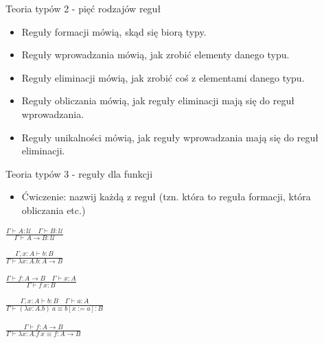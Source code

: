\documentclass{beamer}
\newcommand{\U}{\mathcal{U}}
\begin{document}
\begin{frame}{Teoria typów 2 - pięć rodzajów reguł}
\begin{itemize}
	\item Reguły formacji mówią, skąd się biorą typy.
	\item Reguły wprowadzania mówią, jak zrobić elementy danego typu.
	\item Reguły eliminacji mówią, jak zrobić coś z elementami danego typu.
	\item Reguły obliczania mówią, jak reguły eliminacji mają się do reguł wprowadzania.
	\item Reguły unikalności mówią, jak reguły wprowadzania mają się do reguł eliminacji.
\end{itemize}
\end{frame}

\begin{frame}{Teoria typów 3 - reguły dla funkcji}

\begin{itemize}
	\item Ćwiczenie: nazwij każdą z reguł (tzn. która to reguła formacji, która obliczania etc.)
\end{itemize}

	\begin{center}
		$\displaystyle \frac{\Gamma \vdash A : \U \quad \Gamma \vdash B : \U}{\Gamma \vdash A \to B : \U}$
	\end{center}
	\begin{center}
		$\displaystyle \frac{\Gamma, x : A \vdash b : B}{\Gamma \vdash \lambda x:A.b : A \to B}$
	\end{center}
	\begin{center}
		$\displaystyle \frac{\Gamma \vdash f : A \to B \quad \Gamma \vdash x : A}{\Gamma \vdash f\ x : B}$
	\end{center}
	\begin{center}
		$\displaystyle \frac{\Gamma, x : A \vdash b : B \quad \Gamma \vdash a : A}{\Gamma \vdash (\lambda x:A.b)\ a \equiv b[x := a] : B}$
	\end{center}
	\begin{center}
		$\displaystyle \frac{\Gamma \vdash f : A \to B}{\Gamma \vdash \lambda x:A.f\ x \equiv f : A \to B}$
	\end{center}
\end{frame}
\end{document}
